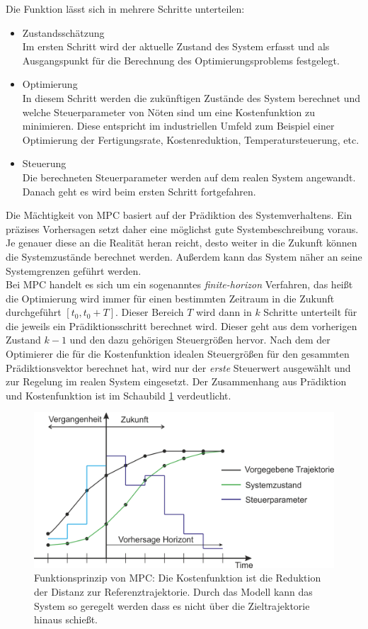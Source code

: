 \documentclass{like}
\begin{document}
Die Funktion lässt sich in mehrere Schritte unterteilen:
\begin{itemize}
	\item Zustandsschätzung \\ Im ersten Schritt wird der aktuelle Zustand des System erfasst und als Ausgangspunkt für die Berechnung des Optimierungsproblems festgelegt.
	\item Optimierung \\ In diesem Schritt werden die zukünftigen Zustände des System berechnet und welche Steuerparameter von Nöten sind um eine Kostenfunktion zu minimieren. Diese entspricht im industriellen Umfeld zum Beispiel einer Optimierung der Fertigungsrate, Kostenreduktion,  Temperatursteuerung, etc.
	\item Steuerung \\ Die berechneten Steuerparameter werden auf dem realen System angewandt. Danach geht es wird beim ersten Schritt  fortgefahren.   
\end{itemize}


Die Mächtigkeit von \ac{MPC} basiert auf der Prädiktion des Systemverhaltens. Ein präzises Vorhersagen setzt daher eine möglichst gute Systembeschreibung voraus. Je genauer diese an die Realität heran reicht, desto weiter in die Zukunft können die Systemzustände berechnet werden. Außerdem kann das System näher an seine Systemgrenzen geführt werden. \\
Bei \acl{MPC} handelt es sich um ein sogenanntes \textit{finite-horizon} Verfahren, das heißt die Optimierung wird immer für einen bestimmten Zeitraum in die Zukunft durchgeführt $ [t_0, t_0 + T] $. Dieser Bereich \(T\) wird dann in \(k\) Schritte unterteilt für die jeweils ein Prädiktionsschritt berechnet wird. Dieser geht aus dem vorherigen Zustand $k -1$ und den dazu gehörigen Steuergrößen hervor. Nach dem der Optimierer die für die Kostenfunktion idealen Steuergrößen für den gesammten Prädiktionsvektor berechnet hat, wird nur der \emph{erste} Steuerwert ausgewählt und zur Regelung im realen System eingesetzt. Der Zusammenhang aus Prädiktion und Kostenfunktion ist im Schaubild \ref{fig:mpcTheory} verdeutlicht.

\begin{figure}[ht!]
	\centering
	\includegraphics[width=350pt]{Abbildungen/mpcParadigm.png}
	\caption{Funktionsprinzip von \ac{MPC}: Die Kostenfunktion ist die Reduktion der Distanz zur Referenztrajektorie. Durch das Modell kann das System so geregelt werden dass es nicht über die Zieltrajektorie hinaus schießt.}
	\label{fig:mpcTheory}
\end{figure}
\end{document}
